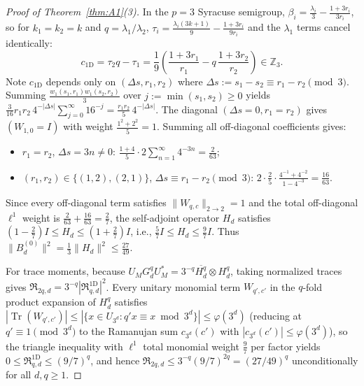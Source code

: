 \documentclass[11pt,a4paper]{article}
\numberwithin{equation}{section}
\theoremstyle{definition}
\theoremstyle{remark}
\newcommand{\Z}{\mathbb{Z}}
\begin{document}
\begin{proof}[Proof of Theorem~\ref{thm:A1}(3)]
In the $p = 3$ Syracuse semigroup, $\beta_i = \frac{\lambda_i}{3} - \frac{1+3r_i}{3r_i}$, so for $k_1 = k_2 = k$ and $q = \lambda_1/\lambda_2$, $\tau_i = \frac{\lambda_i(3k+1)}{9} - \frac{1+3r_i}{9r_i}$ and the $\lambda_1$ terms cancel identically:
\[
c_{\mathrm{1D}} = \tau_2 q - \tau_1 = \frac{1}{9}\left(\frac{1+3r_1}{r_1} - q\,\frac{1+3r_2}{r_2}\right) \in \Z_3.
\]
Note $c_{\mathrm{1D}}$ depends only on $(\Delta s, r_1, r_2)$ where $\Delta s := s_1 - s_2 \equiv r_1 - r_2 \pmod 3$. Summing $\frac{w_1(s_1, r_1)w_1(s_2, r_2)}{3}$ over $j := \min(s_1, s_2) \ge 0$ yields $\frac{3}{16}r_1 r_2\, 4^{-|\Delta s|}\sum_{j=0}^\infty 16^{-j} = \frac{r_1 r_2}{5}\,4^{-|\Delta s|}$. The diagonal $(\Delta s = 0, r_1 = r_2)$ gives $(W_{1,0} = I)$ with weight $\frac{1^2+2^2}{5} = 1$. Summing all off-diagonal coefficients gives:
\begin{itemize}[leftmargin=2em]
\item $r_1 = r_2$, $\Delta s = 3n \neq 0$: $\frac{1+4}{5}\cdot 2\sum_{n=1}^\infty 4^{-3n} = \frac{2}{63}$;
\item $(r_1, r_2) \in \{(1,2), (2,1)\}$, $\Delta s \equiv r_1 - r_2 \pmod 3$: $2\cdot\frac{2}{5}\cdot\frac{4^{-1}+4^{-2}}{1 - 4^{-3}} = \frac{16}{63}$.
\end{itemize}
Since every off-diagonal term satisfies $\|W_{q,c}\|_{2\to 2} = 1$ and the total off-diagonal $\ell^1$ weight is $\frac{2}{63} + \frac{16}{63} = \frac{2}{7}$, the self-adjoint operator $H_d$ satisfies $(1 - \frac{2}{7})I \le H_d \le (1 + \frac{2}{7})I$, i.e., $\frac{5}{7} I \le H_d \le \frac{9}{7} I$. Thus $\|B_d^{(0)}\|^2 = \frac{1}{3}\|H_d\|^2 \le \frac{27}{49}$.

For trace moments, because $U_M G_d^q U_M^* = 3^{-q}\overline{H_d^q}\otimes H_d^q$, taking normalized traces gives $\mathfrak{R}_{2q, d} = 3^{-q}|\mathfrak{R}_{q, d}^{\mathrm{1D}}|^2$. Every unitary monomial term $W_{q', c'}$ in the $q$-fold product expansion of $H_d^q$ satisfies $|\operatorname{Tr}(W_{q', c'})| \le |\{x \in U_{3^d} : q'x \equiv x \bmod 3^d\}| \le \varphi(3^d)$ (reducing at $q' \equiv 1 \pmod{3^d}$ to the Ramanujan sum $c_{3^d}(c')$ with $|c_{3^d}(c')| \le \varphi(3^d)$), so the triangle inequality with $\ell^1$ total monomial weight $\frac{9}{7}$ per factor yields $0 \le \mathfrak{R}_{q, d}^{\mathrm{1D}} \le (9/7)^q$, and hence $\mathfrak{R}_{2q, d} \le 3^{-q}(9/7)^{2q} = (27/49)^q$ unconditionally for all $d, q \ge 1$.
\end{proof}
\end{document}
